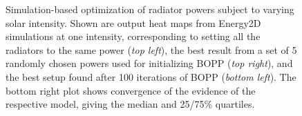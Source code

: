\begin{figure}[p]
{		Simulation-based optimization of radiator powers subject to varying solar intensity. Shown are output heat maps from Energy2D \citep{xie2012energy2d} simulations at one intensity, corresponding to setting all the radiators to the same power (\emph{top left}), the best result from a set of 5 randomly chosen powers used for initializing BOPP (\emph{top right}), and the best setup found after 100 iterations of BOPP (\emph{bottom left}). The bottom right plot shows convergence of the evidence of the respective model, giving the median and 25/75\% quartiles.
}
\end{figure}
